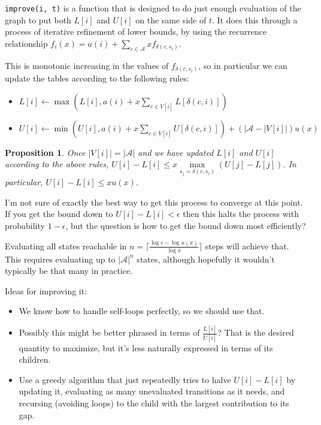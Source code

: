 \documentclass[a4paper]{book}
\newtheorem{proposition}{Proposition}
\begin{document}
\texttt{improve(i, t)} is a function that is designed to do just enough evaluation of the graph to put both \(L[i]\) and \(U[i]\) on the same side of \(t\).
It does this through a process of iterative refinement of lower bounds,
by using the recurrence relationship \(f_i(x) = a(i) + \sum\limits_{c \in \mathcal{A}} x f_{\delta(c, s_i)}\).

This is monotonic increasing in the values of \(f_{\delta(c, s_i)}\),
so in particular we can update the tables according to the following rules:

\begin{itemize}
\item \(L[i] \leftarrow \max(L[i], a(i) + x \sum\limits_{c \in V[i]} L[\delta(c, i)])\)
\item \(U[i] \leftarrow \min(U[i], a(i) + x \sum\limits_{c \in V[i]} U[\delta(c, i)]) + (|\mathcal{A} - |V[i]|)u(x)\)
\end{itemize}

\begin{proposition}
Once \(|V[i]| = |\mathcal{A}|\) and we have updated \(L[i]\) and \(U[i]\) according to the above rules,
\(U[i] - L[i] \leq x \max\limits_{s_j = \delta(c, s_i)} (U[j] - L[j])\).
In particular, \(U[i] - L[i] \leq x u(x)\).
\end{proposition}

I'm not sure of exactly the best way to get this process to converge at this point.
If you get the bound down to \(U[i] - L[i] < \epsilon\) then this halts the process with probability \(1 - \epsilon\),
but the question is how to get the bound down most efficiently?

Evaluating all states reachable in \(n = \lceil\frac{\log \epsilon - \log u(x)}{\log x}\rceil\) steps will achieve that.
This requires evaluating up to \(|\mathcal{A}|^n\) states,
although hopefully it wouldn't typically be that many in practice.

Ideas for improving it:

\begin{itemize}
\item We know how to handle self-loops perfectly, so we should use that.
\item Possibly this might be better phrased in terms of \(\frac{L[i]}{U[i]}\)?
That is the desired quantity to maximize, but it's less naturally expressed in terms of its children.
\item Use a greedy algorithm that just repeatedly tries to halve \(U[i] - L[i]\) by updating it,
evaluating as many unevaluated transitions as it needs, and recursing (avoiding loops) to the child with the largest contribution to its gap.
\end{itemize}
\end{document}
